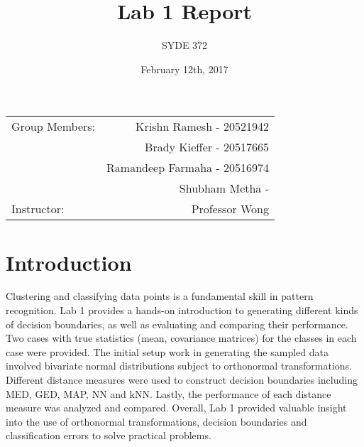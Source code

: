 \documentclass{article}
\title{Lab 1 Report} %
\author{SYDE 372} %
\date{February 12th, 2017} %
\begin{document}
\maketitle

\begin{center}
\begin{tabular}{l r}
Group Members: & Krishn Ramesh - 20521942 \\ %
& Brady Kieffer - 20517665 \\
& Ramandeep Farmaha - 20516974 \\
& Shubham Metha - \\
Instructor: & Professor Wong %
\end{tabular}
\end{center}



\section{Introduction}

Clustering and classifying data points is a fundamental skill in pattern recognition. Lab 1 provides a hands-on introduction to generating different kinds of decision boundaries, as well as evaluating and comparing their performance. Two cases with true statistics (mean, covariance matrices) for the classes in each case were provided. The initial setup work in generating the sampled data involved bivariate normal distributions subject to orthonormal transformations. Different distance measures were used to construct decision boundaries including MED, GED, MAP, NN and kNN. Lastly, the performance of each distance measure was analyzed and compared. Overall, Lab 1 provided valuable insight into the use of orthonormal transformations, decision boundaries and classification errors to solve practical problems.
\end{document}
